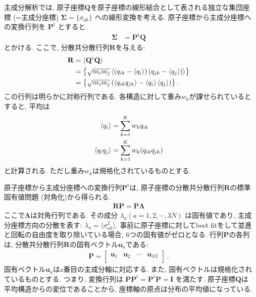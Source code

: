 主成分解析では, 原子座標$\mathbf{Q}$を原子座標の線形結合として表される独立な集団座標 (=主成分座標) $\mathbf{\Sigma} = \{\sigma_{ak}\}$ への線形変換を考える.
原子座標から主成分座標への変換行列を $\mathbf{P}^{\mathrm{t}}$ とすると
\begin{align}
  \mathbf{\Sigma} &= \mathbf{P}^{\mathrm{t}} \mathbf{Q} %
\end{align}
とかける.
ここで, 分散共分散行列$\mathbf{R}$を与える:
\begin{align}
  \mathbf{R} &=
  \langle \mathbf{Q}^{\mathrm{t}} \mathbf{Q} \rangle
  \notag
  \\
  &=
  \left\{
  \sqrt{m_{i} m_{j}}
        \left\langle
                    \left( q_{ik} - \langle q_{i} \rangle \right)
                    \left( q_{jk} - \langle q_{j} \rangle \right)
        \right\rangle
  \right\}
  \notag
  \\
  &=
  \left\{
        \sqrt{m_{i} m_{j}}
        \left(
               \left\langle q_{ik} q_{jk} \right\rangle
             - \left\langle q_{i} \right\rangle
               \left\langle q_{j} \right\rangle
        \right)
  \right\} .
  \notag
\end{align}
この行列は明らかに対称行列である.
各構造に対して重み$w_{k}$が課せられているとすると, 平均は
\begin{align}
  \left\langle q_{i} \right\rangle
  &=
  \sum_{k=1}^{K} w_{k} q_{ik}
  \notag
  \\
  \left\langle q_{i} q_{j} \right\rangle
  &=
  \sum_{k=1}^{K} w_{k} (q_{ik} q_{jk})
  \notag
\end{align}
と計算される. ただし重み$w_{k}$は規格化されているものとする.

原子座標から主成分座標への変換行列$\mathbf{P}^{\mathrm{t}}$は, 原子座標の分散共分散行列$\mathbf{R}$の標準固有値問題 (対角化)から得られる.
\begin{align}
  \mathbf{R}\mathbf{P} =  \mathbf{P} \mathbf{\Lambda} %
\end{align}
ここで$\mathbf{\Lambda}$は対角行列である. その成分 $\lambda_{a} (a = 1,2, \cdots, 3N)$ は固有値であり, 主成分座標方向の分散を表す:
 $\lambda_{a} = \langle \sigma_{ak} ^{2} \rangle$.
事前に原子座標に対してbest fitをして並進と回転の自由度を取り除いている場合, 6つの固有値がゼロとなる.
行列$\mathbf{P}$の各列は, 分散共分散行列$\mathbf{R}$の固有ベクトル$\mathbf{u}_{a}$である:
\begin{align}
  \mathbf{P} =
  \left[
        \begin{array}{cccc}
         \mathbf{u}_{1} &
         \mathbf{u}_{2} &
         \cdots &
         \mathbf{u}_{3N} \\
         \end{array}
  \right]~.
\end{align}
固有ベクトル$\mathbf{u}_{a}$はa番目の主成分軸に対応する.
また, 固有ベクトルは規格化されているものとする. つまり, 変換行列は
$\mathbf{P}\mathbf{P}^{\mathrm{t}} = \mathbf{P}^{\mathrm{t}} \mathbf{P} = \mathbf{I}$ を満たす.
原子座標$\mathbf{Q}$は平均構造からの変位であることから, 座標軸の原点は分布の平均値になっている.


